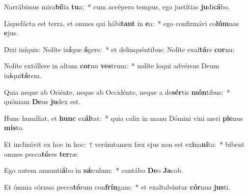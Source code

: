 \item Narrábimus mira\textbf{bí}lia \textbf{tu}a:~* cum accépero tempus, ego justítias \textbf{ju}di\textbf{cá}bo.
\item Liquefácta est terra, et omnes qui hábi\textbf{tant} in \textbf{e}a:~* ego confirmávi co\textbf{lúm}nas \textbf{e}jus.
\item Dixi iníquis: Nolíte in\textbf{í}que \textbf{á}gere:~* et delinquéntibus: Nolíte exal\textbf{tá}re \textbf{cor}nu:
\item Nolíte extóllere in altum \textbf{cor}nu \textbf{ves}trum:~* nolíte loqui advérsus Deum in\textbf{i}qui\textbf{tá}tem.
\item Quia neque ab Oriénte, neque ab Occidénte, neque a de\textbf{sér}tis \textbf{món}tibus:~* quóniam \textbf{De}us \textbf{ju}dex est.
\item Hunc humíliat, et \textbf{hunc} ex\textbf{ál}tat:~* quia calix in manu Dómini vini meri \textbf{ple}nus \textbf{mis}to.
\item Et inclinávit ex hoc in hoc:~† verúmtamen fæx ejus non est ex\textbf{i}na\textbf{ní}ta:~* bibent omnes pecca\textbf{tó}res \textbf{ter}ræ.
\item Ego autem annunti\textbf{á}bo in \textbf{sǽ}culum:~* cantábo \textbf{De}o \textbf{Ja}cob.
\item Et ómnia córnua pecca\textbf{tó}rum con\textbf{frín}gam:~* et exaltabúntur \textbf{cór}nua \textbf{jus}ti.
